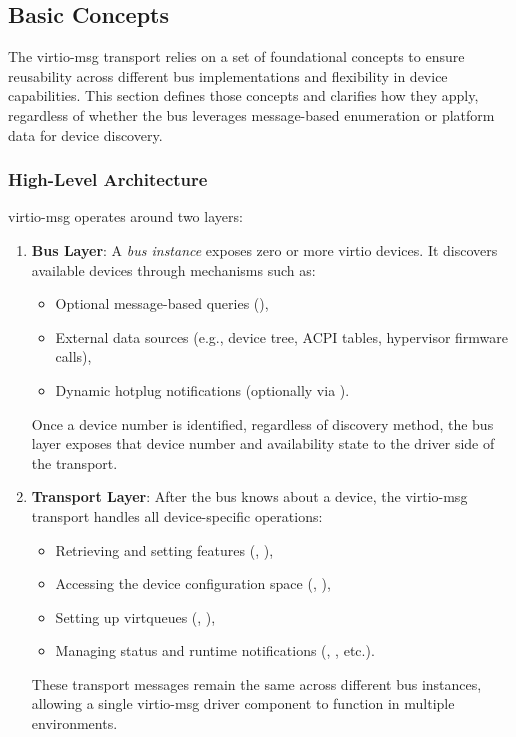 \subsection{Basic Concepts}
\label{sec:Virtio Transport Options / Virtio Over Messages / Basic Concepts}

The virtio-msg transport relies on a set of foundational concepts to ensure
reusability across different bus implementations and flexibility in device
capabilities. This section defines those concepts and clarifies how they apply,
regardless of whether the bus leverages message-based enumeration or platform
data for device discovery.

\subsubsection{High-Level Architecture}

virtio-msg operates around two layers:

\begin{enumerate}
  \item \textbf{Bus Layer}: A \emph{bus instance} exposes zero or more virtio
        devices. It discovers available devices through mechanisms such as:
    \begin{itemize}
      \item Optional message-based queries (),
      \item External data sources (e.g., device tree, ACPI tables, hypervisor
        firmware calls),
      \item Dynamic hotplug notifications (optionally via ).
    \end{itemize}
    Once a device number is identified, regardless of discovery method, the bus
    layer exposes that device number and availability state to the driver side
    of the transport.

  \item \textbf{Transport Layer}: After the bus knows about a device, the
        virtio-msg transport handles all device-specific operations:
    \begin{itemize}
      \item Retrieving and setting features (,
        ),
      \item Accessing the device configuration space (,
        ),
      \item Setting up virtqueues (, ),
      \item Managing status and runtime notifications (,
        , etc.).
    \end{itemize}
    These transport messages remain the same across different bus instances,
    allowing a single virtio-msg driver component to function in multiple
    environments.
\end{enumerate}


